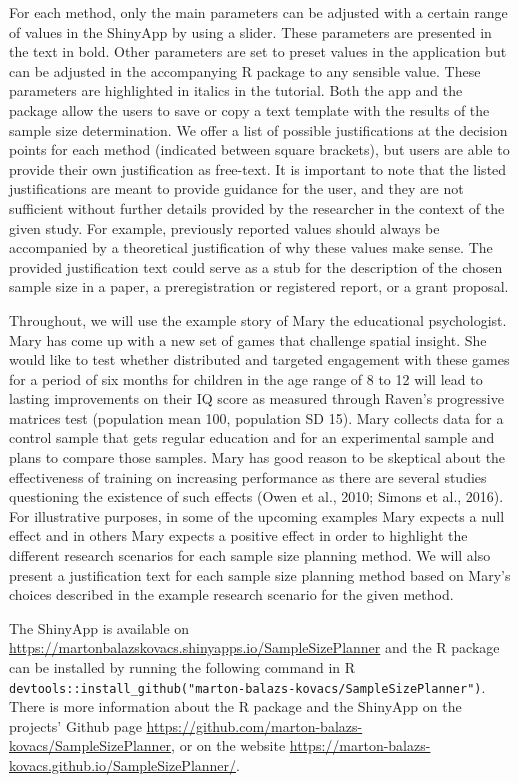 \documentclass[
  english,
  man,floatsintext]{apa6}
\begin{document}
For each method, only the main parameters can be adjusted with a certain range of values in the ShinyApp by using a slider. These parameters are presented in the text in bold. Other parameters are set to preset values in the application but can be adjusted in the accompanying R package to any sensible value. These parameters are highlighted in italics in the tutorial. Both the app and the package allow the users to save or copy a text template with the results of the sample size determination. We offer a list of possible justifications at the decision points for each method (indicated between square brackets), but users are able to provide their own justification as free-text. It is important to note that the listed justifications are meant to provide guidance for the user, and they are not sufficient without further details provided by the researcher in the context of the given study. For example, previously reported values should always be accompanied by a theoretical justification of why these values make sense. The provided justification text could serve as a stub for the description of the chosen sample size in a paper, a preregistration or registered report, or a grant proposal.

Throughout, we will use the example story of Mary the educational psychologist. Mary has come up with a new set of games that challenge spatial insight. She would like to test whether distributed and targeted engagement with these games for a period of six months for children in the age range of 8 to 12 will lead to lasting improvements on their IQ score as measured through Raven's progressive matrices test (population mean 100, population SD 15). Mary collects data for a control sample that gets regular education and for an experimental sample and plans to compare those samples. Mary has good reason to be skeptical about the effectiveness of training on increasing performance as there are several studies questioning the existence of such effects (Owen et al., 2010; Simons et al., 2016). For illustrative purposes, in some of the upcoming examples Mary expects a null effect and in others Mary expects a positive effect in order to highlight the different research scenarios for each sample size planning method. We will also present a justification text for each sample size planning method based on Mary's choices described in the example research scenario for the given method.

The ShinyApp is available on \url{https://martonbalazskovacs.shinyapps.io/SampleSizePlanner} and the R package can be installed by running the following command in R \texttt{devtools::install\_github("marton-balazs-kovacs/SampleSizePlanner")}. There is more information about the R package and the ShinyApp on the projects' Github page \url{https://github.com/marton-balazs-kovacs/SampleSizePlanner}, or on the website \url{https://marton-balazs-kovacs.github.io/SampleSizePlanner/}.
\end{document}
